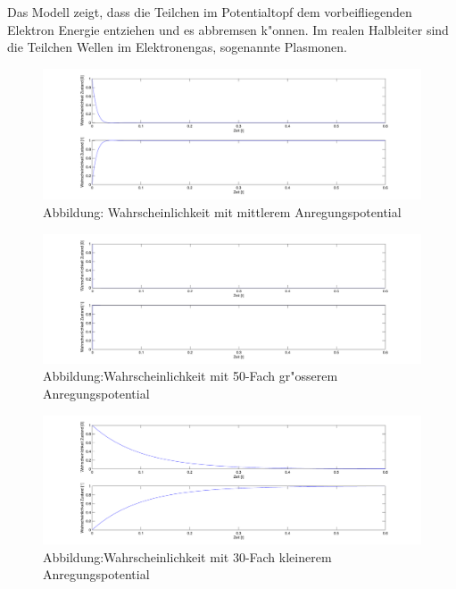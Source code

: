\begin{refsection}
Das Modell zeigt, dass die Teilchen im Potentialtopf dem vorbeifliegenden
Elektron Energie entziehen und es abbremsen k"onnen.
Im realen Halbleiter sind die Teilchen Wellen im Elektronengas,
sogenannte Plasmonen.

\begin{figure}
\centering
\includegraphics[width=1\textwidth]{flash/graphics/potentialmittel.pdf}
\caption{Abbildung: Wahrscheinlichkeit mit mittlerem Anregungspotential
\label{skript:potentialmittel}}
\end{figure}

\begin{figure}
\centering
\includegraphics[width=1\textwidth]{flash/graphics/potentialgross.pdf}
\caption{Abbildung:Wahrscheinlichkeit mit 50-Fach gr"osserem Anregungspotential
\label{skript:potentialgross}}
\end{figure}

\begin{figure}
\centering
\includegraphics[width=1\textwidth]{flash/graphics/potentialklein.pdf}
\caption{Abbildung:Wahrscheinlichkeit mit 30-Fach kleinerem Anregungspotential
\label{skript:potentialklein}}
\end{figure}

\printbibliography[heading=subbibliography]
\end{refsection}
